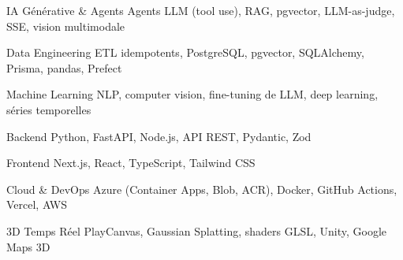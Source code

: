 


\begin{cvskills}


\cvskill
{IA Générative \& Agents}
{Agents LLM (tool use), RAG, pgvector, LLM-as-judge, SSE, vision multimodale}


\cvskill
{Data Engineering}
{ETL idempotents, PostgreSQL, pgvector, SQLAlchemy, Prisma, pandas, Prefect}


\cvskill
{Machine Learning}
{NLP, computer vision, fine-tuning de LLM, deep learning, séries temporelles}


\cvskill
{Backend}
{Python, FastAPI, Node.js, API REST, Pydantic, Zod}


\cvskill
{Frontend}
{Next.js, React, TypeScript, Tailwind CSS}


\cvskill
{Cloud \& DevOps}
{Azure (Container Apps, Blob, ACR), Docker, GitHub Actions, Vercel, AWS}


\cvskill
{3D Temps Réel}
{PlayCanvas, Gaussian Splatting, shaders GLSL, Unity, Google Maps 3D}


\end{cvskills}
